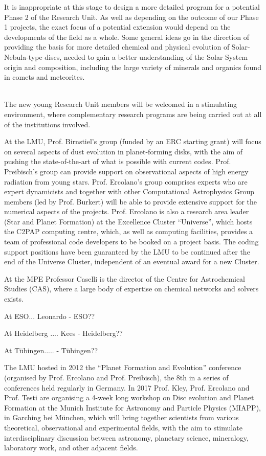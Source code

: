 \documentclass[12pt]{article}
\begin{document}
It is inappropriate at this stage to design a more detailed program
for a potential Phase 2 of the Research Unit. As well as depending on
the outcome of our Phase 1 projects, the exact focus of a potential
extension would depend on the developments of the field as a
whole. Some general ideas go in the direction of providing the basis for more detailed chemical
and physical evolution of Solar-Nebula-type discs, needed to gain a
better understanding of the Solar System origin and composition,
including the large variety of minerals and organics found in comets
and meteorites. 
\vspace{0.8em}

\\

The new young Research Unit members will be welcomed in a stimulating
environment, where complementary research programs are being carried
out at all of the institutions involved. 

At the LMU, Prof. Birnstiel's group (funded by an ERC starting grant)
will focus on several aspects of dust evolution in planet-forming
disks, with the aim of pushing the state-of-the-art of what is
possible with current codes. Prof. Preibisch's group can provide
support on observational aspects of high energy radiation from young
stars. Prof. Ercolano's group comprises experts who are expert
dynamicists
and together with other Computational Astrophysics Group members (led
by Prof. Burkert) will be
able to provide extensive support for the numerical aspects of the
projects. Prof. Ercolano is also a research area leader (Star and
Planet Formation) at the
Excellence Cluster ``Universe'', which hosts the C2PAP computing
centre, which, as well as computing facilities, provides a team of
professional code developers to be booked on a project basis. The
coding support positions have been guaranteed by the LMU to be
continued after the end of the Universe Cluster, independent of an
eventual award for a new Cluster. 

At the MPE Professor Caselli is the director of the Centre for Astrochemical
Studies (CAS), where a large body of expertise on chemical
networks and solvers exists. 

{\color{red} At ESO...  Leonardo - ESO??}

{\color{red} At Heidelberg .... Kees - Heidelberg??}

{\color{red} At Tübingen.....  - T\"ubingen??}

The LMU hosted in 2012 the ``Planet Formation and Evolution''
conference (organised by Prof. Ercolano and Prof. Preibisch), the 8th
in a series of conferences held regularly in Germany. In 2017
Prof. Kley, Prof. Ercolano and Prof. Testi are organising a 4-week
long workshop on Disc evolution and Planet Formation at the Munich
Institute for Astronomy and Particle Physics (MIAPP), in Garching bei
M\"unchen, which will bring
together scientists from various theoretical, observational and
experimental fields, with the aim to stimulate interdisciplinary
discussion between astronomy, planetary science, mineralogy,
laboratory work, and other adjacent fields. 
\end{document}
